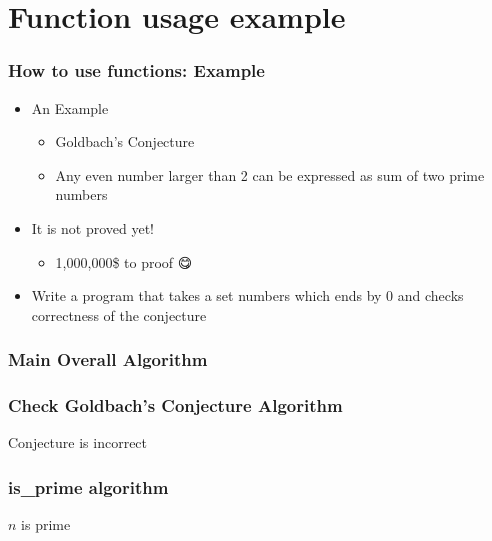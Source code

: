 \documentclass{../c-lecture}
\begin{document}
\section{Function usage example}

\begin{frame}
  \frametitle{How to use functions: Example}
  \begin{itemize}
    \item An Example
    \begin{itemize}
      \item Goldbach’s Conjecture
      \item
        Any even number larger than 2 can be expressed as sum of two prime
        numbers
    \end{itemize}
    \item It is not proved yet!
    \begin{itemize}
      \item 1,000,000\$ to proof 😋
    \end{itemize}
    \item
      Write a program that takes a set numbers which ends by 0 and checks
      correctness of the conjecture
  \end{itemize}
\end{frame}

\begin{frame}[fragile]
  \frametitle{Main Overall Algorithm}
  \begin{algorithm}[H]
  \end{algorithm}
\end{frame}

\begin{frame}[fragile]
  \frametitle{Check Goldbach's Conjecture Algorithm}
  \begin{algorithm}[H]
  \end{algorithm}
  \begin{block}{}
Conjecture is incorrect
  \end{block}
\end{frame}

\begin{frame}
  \frametitle{is\_prime algorithm}
  \begin{algorithm}[H]
  $n$ is prime\;
  \end{algorithm}
\end{frame}
\end{document}

